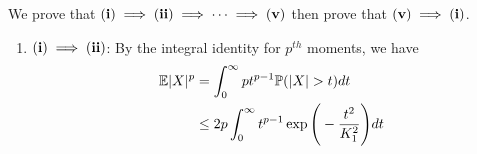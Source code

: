 \begin{proof*}
	We prove that ${\bf (i)}\implies{\bf (ii)}\implies\dots\implies{\bf (v)}$ then prove that ${\bf (v)}\implies{\bf (i)}$.
	\begin{enumerate}
		\item ${\bf (i)}\implies{\bf (ii)}$: By the integral identity for $p^{th}$ moments, we have
		\begin{align*}
			\E|X|^p &= \int_0^\infty pt^{p-1}\Pm(|X|>t)dt \\
				&\le 2p\int_0^\infty t^{p-1}\exp\biggRound{-\frac{t^2}{K_1^2}}dt		
		\end{align*} 	
	\end{enumerate} 
\end{proof*} 
